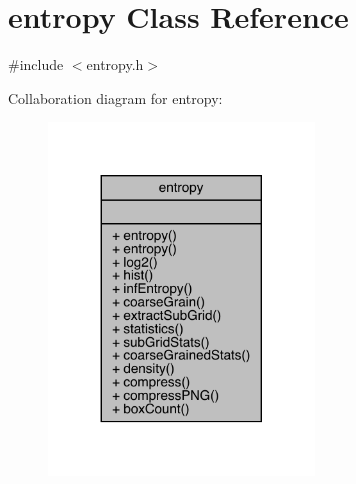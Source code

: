 \hypertarget{classentropy}{}\section{entropy Class Reference}
\label{classentropy}


{\ttfamily \#include $<$entropy.\+h$>$}



Collaboration diagram for entropy\+:
\nopagebreak
\begin{figure}[H]
\begin{center}
\leavevmode
\includegraphics[width=200pt]{classentropy__coll__graph}
\end{center}
\end{figure}
